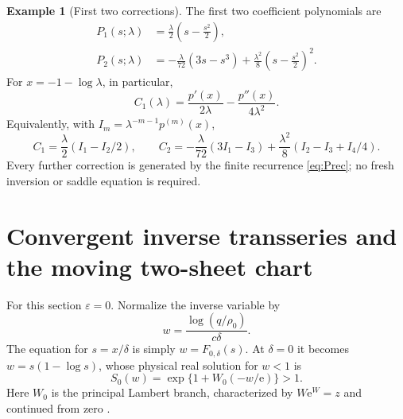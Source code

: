 \documentclass[11pt,a4paper]{article}
\numberwithin{equation}{section}
\theoremstyle{definition}
\newtheorem{example}[theorem]{Example}
\theoremstyle{remark}
\newcommand{\ep}{\varepsilon}\newcommand{\la}{\lambda}
\newcommand{\rhob}{\rho_0}\newcommand{\ee}{\mathrm e}
\begin{document}
\begin{example}[First two corrections]\label{ex:corrections}
The first two coefficient polynomials are
\begin{align}
 P_1(s;\la)&=\frac\la2\left(s-\frac{s^2}{2}\right),\label{eq:P1}\\
 P_2(s;\la)&=-\frac\la{72}(3s-s^3)
       +\frac{\la^2}{8}\left(s-\frac{s^2}{2}\right)^2.\label{eq:P2}
\end{align}
For \(x=-1-\log\la\), in particular,
\begin{equation}\label{eq:C1}
 C_1(\la)=\frac{p'(x)}{2\la}-\frac{p''(x)}{4\la^2}.
\end{equation}
Equivalently, with
\(I_m=\la^{-m-1}p^{(m)}(x)\),
\[
 C_1=\frac\la2(I_1-I_2/2),\qquad
 C_2=-\frac\la{72}(3I_1-I_3)
                 +\frac{\la^2}{8}(I_2-I_3+I_4/4).
\]
Every further correction is generated by the finite recurrence
\eqref{eq:Prec}; no fresh inversion or saddle equation is required.
\end{example}

\section{Convergent inverse transseries and the moving two-sheet chart}
\label{sec:inverse}
For this section \(\ep=0\). Normalize the inverse variable by
\begin{equation}\label{eq:w}
 w=\frac{\log(q/\rhob)}{c\delta}.
\end{equation}
The equation for \(s=x/\delta\) is simply
\(w=F_{0,\delta}(s)\). At \(\delta=0\) it becomes
\(w=s(1-\log s)\), whose physical real solution for \(w<1\) is
\begin{equation}\label{eq:S0}
 S_0(w)=\exp\{1+W_0(-w/\ee)\}>1.
\end{equation}
Here \(W_0\) is the principal Lambert branch, characterized by
\(W\ee^W=z\) and continued from zero \cite{dlmf-lambert}.
\end{document}
